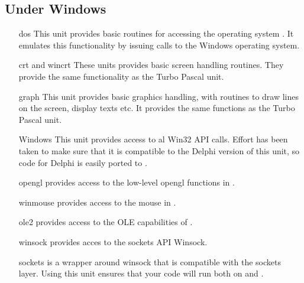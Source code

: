 \documentclass{book}
\begin{document}
%
%
\subsection{Under Windows}
\begin{itemize}
\item [dos] This unit provides basic routines for
accessing the operating system \dos. It emulates this functionality
by issuing calls to the Windows operating system.
\item [crt and wincrt] These units provides basic screen handling routines.
They provide the same functionality as the Turbo Pascal  unit.
\item [graph] This unit provides basic graphics
handling, with routines to draw lines on the screen, display texts etc. It
provides the same functions as the Turbo Pascal unit.
\item [Windows] This unit provides access to al Win32 API calls. Effort has
been taken to make sure that it is compatible to the Delphi version of this
unit, so code for Delphi is easily ported to \fpc.
\item[opengl] provides access to the low-level opengl functions in \windows.
\item[winmouse] provides access to the mouse in \windows.
\item[ole2] provides access to the OLE capabilities of \windows.
\item[winsock] provides acces to the \windows sockets API Winsock.
\item[sockets] is a wrapper around winsock that is compatible with the
\linux sockets layer. Using this unit ensures that your code will run
both on \windows and \linux.
\end{itemize}

%
%
\end{document}
